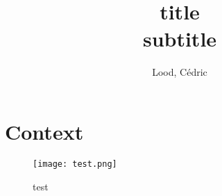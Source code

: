 \documentclass[11pt, a4paper]{article}
\title{ title \\ { subtitle }}
\author{
        Lood, Cédric
}
\begin{document}
\maketitle

\section{Context}

\begin{figure}[H]
    \centering
    \texttt{[image: test.png]}
    \caption{test}
    \label{fig:test}
\end{figure}


 

\end{document}
